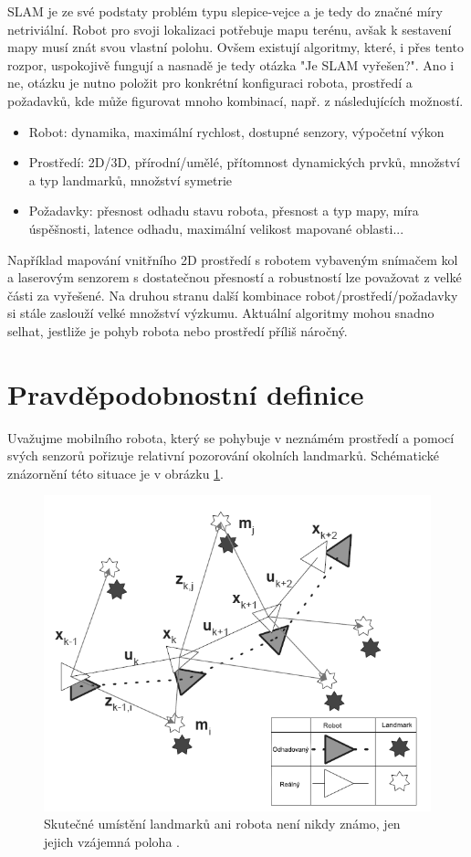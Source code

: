 \documentclass[12pt,a4paper]{report}
\begin{document}
SLAM je ze své podstaty problém typu slepice-vejce a je tedy do značné míry netriviální. Robot pro svoji lokalizaci potřebuje mapu terénu, avšak k sestavení mapy musí znát svou vlastní polohu. Ovšem existují algoritmy, které, i přes tento rozpor, uspokojivě fungují a nasnadě je tedy otázka "Je SLAM vyřešen?". Ano i ne, otázku je nutno položit pro konkrétní konfiguraci robota, prostředí a požadavků, kde může figurovat mnoho kombinací, např. z následujících možností.
\begin{itemize}
\item Robot: dynamika, maximální rychlost, dostupné senzory, výpočetní výkon
\item Prostředí: 2D/3D, přírodní/umělé, přítomnost dynamických prvků, množství a typ landmarků, množství symetrie
\item Požadavky: přesnost odhadu stavu robota, přesnost a typ mapy, míra úspěšnosti, latence odhadu, maximální velikost mapované oblasti...
\end{itemize}
Například mapování vnitřního 2D prostředí s robotem vybaveným snímačem kol a laserovým senzorem s dostatečnou přesností a robustností lze považovat z velké části za vyřešené. Na druhou stranu další kombinace robot/prostředí/požadavky si stále zaslouží velké množství výzkumu. Aktuální algoritmy mohou snadno selhat, jestliže je pohyb robota nebo prostředí příliš náročný.


\section{Pravděpodobnostní definice}
Uvažujme mobilního robota, který se pohybuje v neznámém prostředí a pomocí svých senzorů pořizuje relativní pozorování okolních landmarků. Schématické znázornění této situace je v obrázku \ref{2}.

\begin{figure}[H]
\centering
\includegraphics[scale=0.6]{img/Obr2_b}
\caption{Skutečné umístění landmarků ani robota není nikdy známo, jen jejich vzájemná poloha \cite{Durrant-Whyte}.}
\label{2}
\end{figure}
\end{document}
